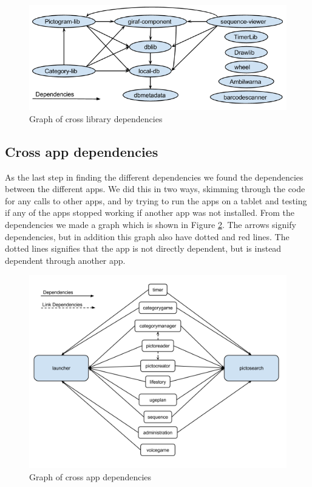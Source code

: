 \begin{figure}[H]
	\centering
	\includegraphics[width=0.8 \textwidth]{pictures/LibLibdependencies.png}
	\caption{Graph of cross library dependencies}
	\label{LibLibdependencies}
\end{figure}


\subsection{Cross app dependencies}
As the last step in finding the different dependencies we found the dependencies between the different apps. We did this in two ways, skimming through the code for any calls to other apps, and by trying to run the apps on a tablet and testing if any of the apps  stopped working if another app was not installed. From the dependencies we made a graph which is shown in Figure \ref{AppAppdependencies}. The arrows signify dependencies, but in addition this graph also have dotted and red lines. The dotted lines signifies that the app is not directly dependent, but is instead dependent through another app.

\begin{figure}[H]
	\centering
	\includegraphics[width=0.8 \textwidth]{pictures/AppAppdependencies.png}
	\caption{Graph of cross app dependencies}
	\label{AppAppdependencies}
\end{figure}